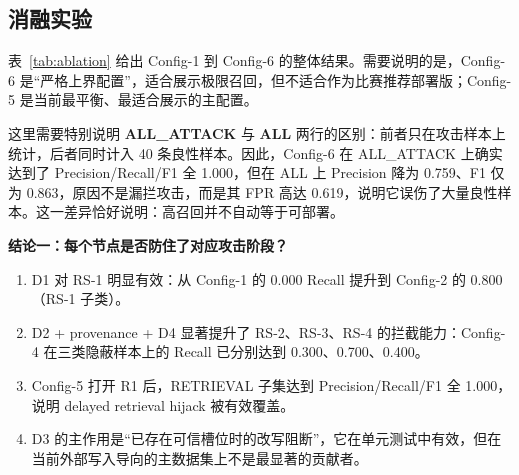 \documentclass[11pt,a4paper]{ctexart}
\begin{document}
\subsection{消融实验}
表~\ref{tab:ablation} 给出 Config-1 到 Config-6 的整体结果。需要说明的是，Config-6 是“严格上界配置”，适合展示极限召回，但不适合作为比赛推荐部署版；Config-5 是当前最平衡、最适合展示的主配置。

\begin{table}[H]
\centering
\caption{Config-1 到 Config-6 的整体消融结果}
\label{tab:ablation}
\end{table}

这里需要特别说明 \textbf{ALL\_ATTACK} 与 \textbf{ALL} 两行的区别：前者只在攻击样本上统计，后者同时计入 40 条良性样本。因此，Config-6 在 ALL\_ATTACK 上确实达到了 Precision/Recall/F1 全 1.000，但在 ALL 上 Precision 降为 0.759、F1 仅为 0.863，原因不是漏拦攻击，而是其 FPR 高达 0.619，说明它误伤了大量良性样本。这一差异恰好说明：高召回并不自动等于可部署。

\textbf{结论一：每个节点是否防住了对应攻击阶段？}
\begin{enumerate}[leftmargin=2em]
  \item D1 对 RS-1 明显有效：从 Config-1 的 0.000 Recall 提升到 Config-2 的 0.800（RS-1 子类）。
  \item D2 + provenance + D4 显著提升了 RS-2、RS-3、RS-4 的拦截能力：Config-4 在三类隐蔽样本上的 Recall 已分别达到 0.300、0.700、0.400。
  \item Config-5 打开 R1 后，RETRIEVAL 子集达到 Precision/Recall/F1 全 1.000，说明 delayed retrieval hijack 被有效覆盖。
  \item D3 的主作用是“已存在可信槽位时的改写阻断”，它在单元测试中有效，但在当前外部写入导向的主数据集上不是最显著的贡献者。
\end{enumerate}
\end{document}
